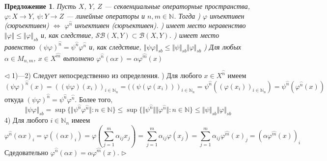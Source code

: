 \documentclass[12pt]{article}
\newtheorem{proposition}[theorem]{Предложение}
\newenvironment{proof}{\par $\triangleleft$}{$\triangleright$}
\begin{document}
\begin{proposition}\label{PrSimplAmplProps}
Пусть $X$, $Y$, $Z$ --- секвенциальные операторные пространства, $\varphi:X\to Y$, $\psi:Y\to Z$ --- линейные операторы и $n,m\in\mathbb{N}$. Тогда
) $\varphi$ инъективен (сюръективен) $\Longleftrightarrow$ $\varphi^{\wideparen{n}}$ инъективен (сюръективен).
) имеет место неравенство $\Vert\varphi\Vert\leq\Vert\varphi\Vert_{sb}$ и, как следствие, $\mathcal{SB}(X,Y)\subset\mathcal{B}(X,Y)$.
) имеет место равенство $(\psi\varphi)^{\wideparen{n}}=\psi^{\wideparen{n}}\varphi^{\wideparen{n}}$ и, как следствие,  $\Vert\psi\varphi\Vert_{sb}\leq\Vert\psi\Vert_{sb}\Vert\varphi\Vert_{sb}$
) Для любых $\alpha\in M_{n,m}$, $x\in X^{\wideparen{m}}$ выполнено $\varphi^{\wideparen{n}}(\alpha x)=\alpha\varphi^{\wideparen{m}}(x)$
\end{proposition}
\begin{proof}
1)---2) Следует непосредственно из определения.
) Для любого $x\in X^{\wideparen{n}}$ имеем
$$(\psi\varphi)^{\wideparen{n}}(x)
=((\psi\varphi)(x_i))_{i\in\mathbb{N}_n}
=((\psi(\varphi(x_i)))_{i\in\mathbb{N}_n}
=\psi^{\wideparen{n}}((\varphi(x_i))_{i\in\mathbb{N}_n})
=\psi^{\wideparen{n}}(\varphi^{\wideparen{n}}(x))
$$
откуда $(\psi\varphi)^{\wideparen{n}}=\psi^{\wideparen{n}}\varphi^{\wideparen{n}}$. Более того, 
$$
\Vert\psi\varphi\Vert_{sb}
=\sup\{\Vert\psi^{\wideparen{n}}\varphi^{\wideparen{n}}\Vert:n\in\mathbb{N}\}
\leq\sup\{\Vert\psi^{\wideparen{n}}\Vert\Vert\varphi^{\wideparen{n}}\Vert:n\in\mathbb{N}\}
\leq\Vert\psi\Vert_{sb}\Vert\varphi\Vert_{sb}
$$
4) Для любого $i\in\mathbb{N}_n$ имеем
$$
\varphi^{\wideparen{n}}(\alpha x)_i
=\varphi((\alpha x)_i)
=\varphi\left(\sum\limits_{j=1}^m \alpha_{ij }x_j\right)
=\sum\limits_{j=1}^m\alpha_{ij} \varphi(x_j)
=\sum\limits_{j=1}^m\alpha_{ij} \varphi^{\wideparen{m}}(x)_j=
(\alpha\varphi^{\wideparen{m}}(x))_i
$$
Сдедовательно $\varphi^{\wideparen{n}}(\alpha x)=\alpha\varphi^{\wideparen{m}}(x)$.
\end{proof}
\end{document}
